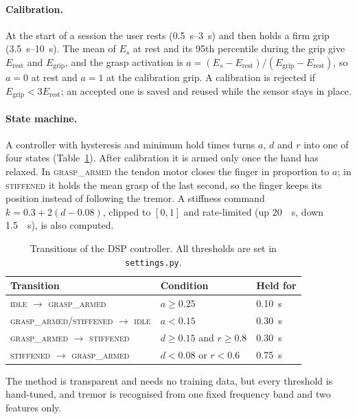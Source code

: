 \paragraph{Calibration.}
At the start of a session the user rests (\SIrange{0.5}{3}{s}) and then holds a firm grip
(\SIrange{3.5}{10}{s}). The mean of $E_s$ at rest and its 95th percentile during the grip
give $E_\text{rest}$ and $E_\text{grip}$, and the grasp activation is
$a = (E_s - E_\text{rest})/(E_\text{grip} - E_\text{rest})$, so $a=0$ at rest and $a=1$ at
the calibration grip. A calibration is rejected if $E_\text{grip} < 3E_\text{rest}$; an
accepted one is saved and reused while the sensor stays in place.

\paragraph{State machine.}
A controller with hysteresis and minimum hold times turns $a$, $d$ and $r$ into one of four
states (Table~\ref{tab:dsp-thresholds}). After calibration it is armed only once the hand
has relaxed. In \textsc{grasp\_armed} the tendon motor closes the finger in proportion to
$a$; in \textsc{stiffened} it holds the mean grasp of the last second, so the finger keeps
its position instead of following the tremor. A stiffness command
$k = 0.3 + 2(d - 0.08)$, clipped to $[0,1]$ and rate-limited (up \SI{20}{\per\second}, down
\SI{1.5}{\per\second}), is also computed.

\begin{table}[h]
  \centering
  \small
  \caption{Transitions of the DSP controller. All thresholds are set in \texttt{settings.py}.}
  \label{tab:dsp-thresholds}
  \begin{tabular}{lll}
    \toprule
    Transition & Condition & Held for \\
    \midrule
    \textsc{idle} $\to$ \textsc{grasp\_armed} & $a \geq 0.25$ & \SI{0.10}{s} \\
    \textsc{grasp\_armed}/\textsc{stiffened} $\to$ \textsc{idle} & $a < 0.15$ & \SI{0.30}{s} \\
    \textsc{grasp\_armed} $\to$ \textsc{stiffened} & $d \geq 0.15$ and $r \geq 0.8$ & \SI{0.30}{s} \\
    \textsc{stiffened} $\to$ \textsc{grasp\_armed} & $d < 0.08$ or $r < 0.6$ & \SI{0.75}{s} \\
    \bottomrule
  \end{tabular}
\end{table}

The method is transparent and needs no training data, but every threshold is hand-tuned,
and tremor is recognised from one fixed frequency band and two features only.
